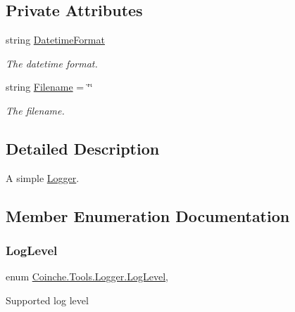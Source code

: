 \subsection*{Private Attributes}
\begin{DoxyCompactItemize}
\item 
string \hyperlink{class_coinche_1_1_tools_1_1_logger_a3f00d015e0ea9978712a23abac8511b1}{Datetime\+Format}
\begin{DoxyCompactList}\small\item\em The datetime format. \end{DoxyCompactList}\item 
string \hyperlink{class_coinche_1_1_tools_1_1_logger_ab5055f470ac8880f10cf72f4ba6709f2}{Filename} = \char`\"{}\char`\"{}
\begin{DoxyCompactList}\small\item\em The filename. \end{DoxyCompactList}\end{DoxyCompactItemize}


\subsection{Detailed Description}
A simple \hyperlink{class_coinche_1_1_tools_1_1_logger}{Logger}. 



\subsection{Member Enumeration Documentation}
\mbox{\label{class_coinche_1_1_tools_1_1_logger_a92fb562053cc0a63b44bd10d2fb7d929}} 
\subsubsection{\texorpdfstring{Log\+Level}{LogLevel}}
{\footnotesize\ttfamily enum \hyperlink{class_coinche_1_1_tools_1_1_logger_a92fb562053cc0a63b44bd10d2fb7d929}{Coinche.\+Tools.\+Logger.\+Log\+Level}\hspace{0.3cm}{\ttfamily [strong]}, {\ttfamily [private]}}



Supported log level 



